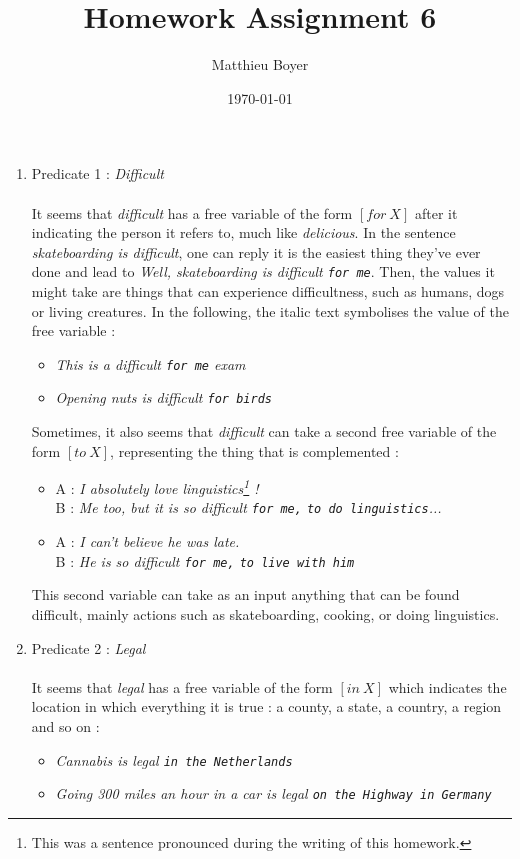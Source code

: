 \documentclass{article}
\title{Homework Assignment 6}
\date{\today}
\author{Matthieu Boyer}
\begin{document}
\maketitle
\begin{enumerate}
    \item Predicate 1 : \textsl{Difficult} \\\\
    It seems that \textsl{difficult} has a free variable of the form ${\left[for\ X\right]}$ after it indicating the person it refers to, much like \textsl{delicious}. In the sentence \textsl{skateboarding is difficult}, one can reply it is the easiest thing they've ever done and lead to \textsl{Well, skateboarding is difficult \texttt{for me}}.
    Then, the values it might take are things that can experience difficultness, such as humans, dogs or living creatures. In the following, the italic text symbolises the value of the free variable :
    \begin{itemize}
        \item \textsl{This is a difficult \texttt{for me} exam}
        \item \textsl{Opening nuts is difficult \texttt{for birds}}
    \end{itemize}

    Sometimes, it also seems that \textsl{difficult} can take a second free variable of the form ${\left[to\ X\right]}$, representing the thing that is complemented :
    \begin{itemize}
        \item A : \textsl{I absolutely love linguistics\footnote{This was a sentence pronounced during the writing of this homework.} !}\\
        B : \textsl{Me too, but it is so difficult \texttt{for me,} \texttt{to do linguistics}...}
        \item A : \textsl{I can't believe he was late.}\\
        B : \textsl{He is so difficult \texttt{for me,} \texttt{to live with him}}
    \end{itemize}
    This second variable can take as an input anything that can be found difficult, mainly actions such as skateboarding, cooking, or doing linguistics.

\item Predicate 2 : \textsl{Legal} \\\\
    It seems that \textsl{legal} has a free variable of the form ${\left[in\ X\right]}$ which indicates the location in which everything it is true : a county, a state, a country, a region and so on : 
    \begin{itemize}
        \item \textsl{Cannabis is legal \texttt{in the Netherlands}}
        \item \textsl{Going 300 miles an hour in a car is legal \texttt{on the Highway in Germany}}
    \end{itemize}


\end{enumerate}
\end{document}
